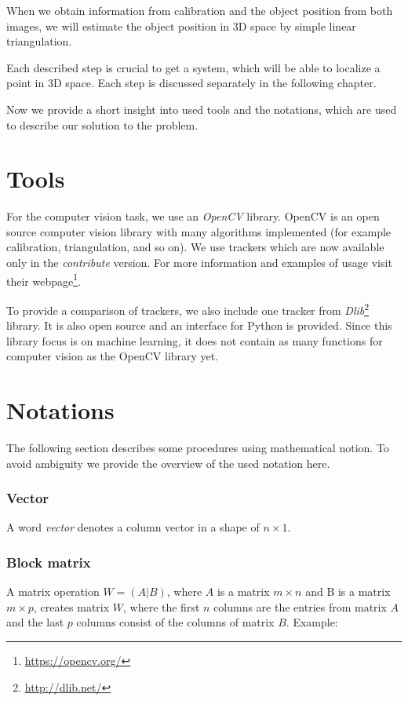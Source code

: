 When we obtain information from calibration and the object position from both
images, we will estimate the object position in 3D space by simple linear
triangulation.

Each described step is crucial to get a system, which will be able to
localize a point in 3D space. Each step is discussed separately in the following
chapter.

Now we provide a short insight into used tools and the notations, which are
used to describe our solution to the problem.

\section{Tools}

For the computer vision task, we use an \emph{OpenCV} library. OpenCV is an open
source computer vision library with many algorithms implemented (for example
calibration, triangulation, and so on). We use trackers which are now available
only in the \emph{contribute} version. For more information and examples of usage
visit their webpage\footnote{\url{https://opencv.org/}}.

To provide a comparison of trackers, we also include one tracker from
\emph{Dlib}\footnote{\url{http://dlib.net/}} library. It is also open source
and an interface for Python is provided.  Since this library focus is on
machine learning, it does not contain as many functions for computer vision
as the OpenCV library yet.

\section{Notations}

The following section describes some procedures using mathematical notion. To
avoid ambiguity we provide the overview of the used notation here.

\subsubsection*{Vector}
A word \emph{vector} denotes a column vector in a shape of $n\times1$.

\subsubsection*{Block matrix}
A matrix operation $W = (A|B)$, where $A$ is a matrix $m \times n$ and B is a
matrix $m \times p$, creates matrix $W$, where the first $n$ columns are the entries from
matrix $A$ and the last $p$ columns consist of the columns of matrix $B$.
Example:

